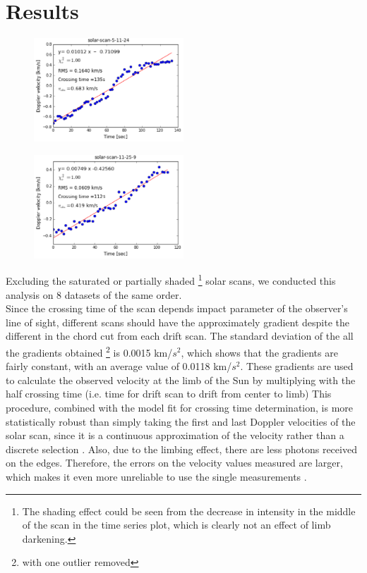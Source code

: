 \documentclass[authoryear, 12pt,5p, times]{elsarticle}
\begin{document}
\section{Results}
\begin{figure}[h!]
\includegraphics[width=0.5\textwidth]{figures/long_cord_dv}
\caption{}
\label{long_cord_dv}
\end{figure}
\begin{figure}[h!]
\includegraphics[width=0.5\textwidth]{figures/short_cord_dv}
\caption{}
\label{short_cord_dv}
\end{figure}

\label{results}
Excluding the saturated or partially shaded \footnote{The shading effect could be seen from the decrease in intensity in the middle of the scan in the time series plot, which is clearly not an effect of limb darkening.} solar scans, we conducted this analysis on 8 datasets of the same order. 
\\
Since the crossing time of the scan depends impact parameter of the observer's line of sight, different scans should have the approximately gradient despite the different in the chord cut from  each drift scan. The standard deviation of the all the gradients obtained \footnote{with one outlier removed} is 0.0015 km/$s^2$, which shows that the gradients are fairly constant, with an average value of 0.0118 km/$s^2$. These gradients are used to calculate the observed velocity at the limb of the Sun by multiplying with the half crossing time (i.e. time for drift scan to drift from center to limb)
This procedure, combined with the model fit for crossing time determination, is more statistically robust than simply taking the first and last Doppler velocities of the solar scan, since it is a continuous approximation of the velocity rather than a discrete selection . Also, due to the limbing effect, there are less photons received on the edges. Therefore, the errors on the velocity values measured are larger, which makes it even more unreliable to use the single measurements .
\end{document}

